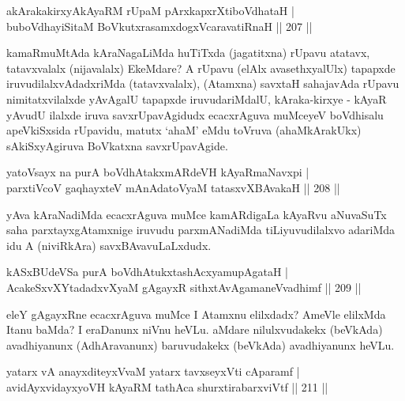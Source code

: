 \begin{shl}
akArakakirxyAkAyaRM rUpaM pArxkapxrXtiboVdhataH |\\
buboVdhayiSitaM BoVkutxrasamxdogxVcaravatiRnaH \hfill || 207 ||
\end{shl}

\begin{artha}
kamaRmuMtAda kAraNagaLiMda huTiTxda (jagatitxna) rUpavu atatavx,  tatavxvalalx (nijavalalx) EkeMdare? A rUpavu (elAlx avasethxyalUlx)  tapapxde iruvudilalxvAdadx\-riMda (tatavxvalalx), (Atamxna) savxtaH sahajavAda rUpavu nimitatxvilalxde \-yAvAgalU tapapxde iruvudariMdalU, kAraka-kirxye - kAyaR yAvudU ilalxde iruva savxrUpavAgidudx ecacxrAguva muMceyeV boVdhisalu apeVkiSxsida rUpavidu, matutx `ahaM' eMdu toVruva (ahaMkArakUkx) sAkiSxyAgiruva BoVkatxna savxrUpavAgide.
\end{artha}

\begin{shl}
yatoV\s sayx na purA boVdhAtakxmARdeVH kAyaRmaNavxpi |\\
parxtiVcoV gaqhayxteV mAnAdatoV\s yaM tatasxvXBAvakaH \hfill || 208 ||
\end{shl}

\begin{artha}
yAva kAraNadiMda ecacxrAguva muMce kamARdigaLa kAyaRvu aNuvaSuTx saha parxtayxgAtamxnige iruvudu parxmANadiMda tiLiyuvudilalxvo adariMda idu A (niviRkAra) savxBAvavuLaLxdudx.
\end{artha}


\begin{shl}
kASxBUdeVSa purA boVdhAtukxtashAcxyamupAgataH |\\
AcakeSxvXYtadadxvXyaM gAgayxR sithxtAvAgamaneV\s vadhimf \hfill || 209 ||
\end{shl}

\begin{artha}
eleY gAgayxRne ecacxrAguva muMce I Atamxnu elilxdadx? AmeVle elilxMda Itanu baMda? I eraDanunx niVnu heVLu. aMdare nilulxvudakekx (beVkAda) avadhiyanunx (AdhAravanunx) baruvudakekx (beVkAda) avadhiyanunx heVLu.
\end{artha}


\begin{shl}
yatarx vA anayxditeyxVvaM yatarx tavxseyxVti cAparamf |\\
avidAyxvidayxyoVH kAyaRM tathAca shurxtirabarxviVtf \hfill || 211 ||
\end{shl}

